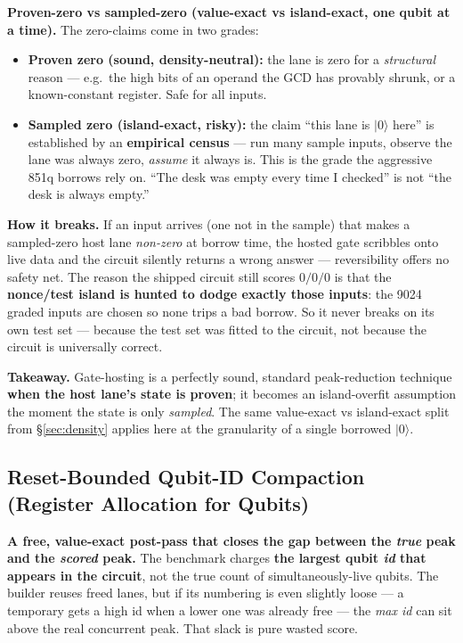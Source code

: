 \documentclass[11pt,a4paper]{article}
\begin{document}
\textbf{Proven-zero vs sampled-zero (value-exact vs island-exact, one qubit at a time).} The
zero-claims come in two grades:
\begin{itemize}
  \item \textbf{Proven zero (sound, density-neutral):} the lane is zero for a \emph{structural}
    reason --- e.g.\ the high bits of an operand the GCD has provably shrunk, or a known-constant
    register. Safe for all inputs.
  \item \textbf{Sampled zero (island-exact, risky):} the claim ``this lane is $|0\rangle$ here'' is
    established by an \textbf{empirical census} --- run many sample inputs, observe the lane was
    always zero, \emph{assume} it always is. This is the grade the aggressive 851q borrows rely on.
    ``The desk was empty every time I checked'' is not ``the desk is always empty.''
\end{itemize}

\textbf{How it breaks.} If an input arrives (one not in the sample) that makes a sampled-zero host
lane \emph{non-zero} at borrow time, the hosted gate scribbles onto live data and the circuit
silently returns a wrong answer --- reversibility offers no safety net. The reason the shipped
circuit still scores $0/0/0$ is that the \textbf{nonce/test island is hunted to dodge exactly those
inputs}: the 9024 graded inputs are chosen so none trips a bad borrow. So it never breaks on its own
test set --- because the test set was fitted to the circuit, not because the circuit is universally
correct.

\textbf{Takeaway.} Gate-hosting is a perfectly sound, standard peak-reduction technique \textbf{when
the host lane's state is proven}; it becomes an island-overfit assumption the moment the state is
only \emph{sampled}. The same value-exact vs island-exact split from \S\ref{sec:density} applies
here at the granularity of a single borrowed $|0\rangle$.

\subsection{Reset-Bounded Qubit-ID Compaction (Register Allocation for Qubits)}
\label{sec:compact}

\textbf{A free, value-exact post-pass that closes the gap between the \emph{true} peak and the
\emph{scored} peak.} The benchmark charges \textbf{the largest qubit \emph{id} that appears in the
circuit}, not the true count of simultaneously-live qubits. The builder reuses freed lanes, but if
its numbering is even slightly loose --- a temporary gets a high id when a lower one was already free
--- the \emph{max id} can sit above the real concurrent peak. That slack is pure wasted score.
\end{document}
